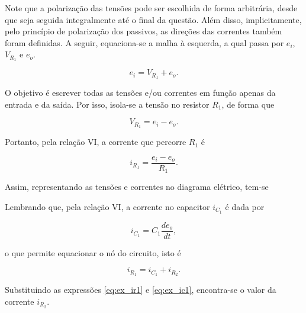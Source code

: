 \documentclass{article}
\numberwithin{equation}{section}
\let\dfr\dfrac
\begin{document}
\noindent Note que a polarização das tensões pode ser escolhida de forma arbitrária, desde que seja seguida integralmente até o final da questão. Além disso, implicitamente, pelo princípio de polarização dos passivos, as direções das correntes também foram definidas. A seguir, equaciona-se a malha à esquerda, a qual passa por $e_i$, $V_{R_1}$ e $e_o$.

\begin{equation*}
    e_{i} = V_{R_{1}} + e_{o}.
\end{equation*}

\noindent O objetivo é escrever todas as tensões e/ou correntes em função apenas da entrada e da saída. Por isso, isola-se a tensão no resistor $R_1$, de forma que

\begin{equation*}
    V_{R_{1}} = e_{i} - e_{o}.
\end{equation*}

\noindent Portanto, pela relação VI, a corrente que percorre $R_1$ é

\begin{equation}
    i_{R_1} = \dfr{e_i-e_o}{R_1}. \label{eq:ex_ir1}
\end{equation}

\noindent Assim, representando as tensões e correntes no diagrama elétrico, tem-se

\begin{center}
\end{center}

\noindent Lembrando que, pela relação VI, a corrente no capacitor $i_{C_1}$ é dada por

\begin{equation}
    i_{C_1} = C_1 \dfr{de_o}{dt}, \label{eq:ex_ic1}
\end{equation}

\noindent o que permite equacionar o nó do circuito, isto é

\begin{equation*}
    i_{R_1} = i_{C_1} + i_{R_2}.
\end{equation*}

\noindent Substituindo as expressões \eqref{eq:ex_ir1} e \eqref{eq:ex_ic1}, encontra-se o valor da corrente $i_{R_2}$.
\end{document}

